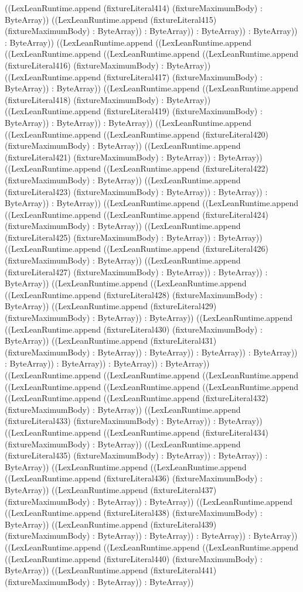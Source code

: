 \documentclass[11pt]{article}
\begin{document}
((LexLeanRuntime.append (fixtureLiteral414) (fixtureMaximumBody) : ByteArray)) ((LexLeanRuntime.append (fixtureLiteral415) (fixtureMaximumBody) : ByteArray)) : ByteArray)) : ByteArray)) : ByteArray)) : ByteArray)) ((LexLeanRuntime.append ((LexLeanRuntime.append ((LexLeanRuntime.append ((LexLeanRuntime.append ((LexLeanRuntime.append (fixtureLiteral416) (fixtureMaximumBody) : ByteArray)) ((LexLeanRuntime.append (fixtureLiteral417) (fixtureMaximumBody) : ByteArray)) : ByteArray)) ((LexLeanRuntime.append ((LexLeanRuntime.append (fixtureLiteral418) (fixtureMaximumBody) : ByteArray)) ((LexLeanRuntime.append (fixtureLiteral419) (fixtureMaximumBody) : ByteArray)) : ByteArray)) : ByteArray)) ((LexLeanRuntime.append ((LexLeanRuntime.append ((LexLeanRuntime.append (fixtureLiteral420) (fixtureMaximumBody) : ByteArray)) ((LexLeanRuntime.append (fixtureLiteral421) (fixtureMaximumBody) : ByteArray)) : ByteArray)) ((LexLeanRuntime.append ((LexLeanRuntime.append (fixtureLiteral422) (fixtureMaximumBody) : ByteArray)) ((LexLeanRuntime.append (fixtureLiteral423) (fixtureMaximumBody) : ByteArray)) : ByteArray)) : ByteArray)) : ByteArray)) ((LexLeanRuntime.append ((LexLeanRuntime.append ((LexLeanRuntime.append ((LexLeanRuntime.append (fixtureLiteral424) (fixtureMaximumBody) : ByteArray)) ((LexLeanRuntime.append (fixtureLiteral425) (fixtureMaximumBody) : ByteArray)) : ByteArray)) ((LexLeanRuntime.append ((LexLeanRuntime.append (fixtureLiteral426) (fixtureMaximumBody) : ByteArray)) ((LexLeanRuntime.append (fixtureLiteral427) (fixtureMaximumBody) : ByteArray)) : ByteArray)) : ByteArray)) ((LexLeanRuntime.append ((LexLeanRuntime.append ((LexLeanRuntime.append (fixtureLiteral428) (fixtureMaximumBody) : ByteArray)) ((LexLeanRuntime.append (fixtureLiteral429) (fixtureMaximumBody) : ByteArray)) : ByteArray)) ((LexLeanRuntime.append ((LexLeanRuntime.append (fixtureLiteral430) (fixtureMaximumBody) : ByteArray)) ((LexLeanRuntime.append (fixtureLiteral431) (fixtureMaximumBody) : ByteArray)) : ByteArray)) : ByteArray)) : ByteArray)) : ByteArray)) : ByteArray)) : ByteArray)) : ByteArray)) ((LexLeanRuntime.append ((LexLeanRuntime.append ((LexLeanRuntime.append ((LexLeanRuntime.append ((LexLeanRuntime.append ((LexLeanRuntime.append ((LexLeanRuntime.append ((LexLeanRuntime.append (fixtureLiteral432) (fixtureMaximumBody) : ByteArray)) ((LexLeanRuntime.append (fixtureLiteral433) (fixtureMaximumBody) : ByteArray)) : ByteArray)) ((LexLeanRuntime.append ((LexLeanRuntime.append (fixtureLiteral434) (fixtureMaximumBody) : ByteArray)) ((LexLeanRuntime.append (fixtureLiteral435) (fixtureMaximumBody) : ByteArray)) : ByteArray)) : ByteArray)) ((LexLeanRuntime.append ((LexLeanRuntime.append ((LexLeanRuntime.append (fixtureLiteral436) (fixtureMaximumBody) : ByteArray)) ((LexLeanRuntime.append (fixtureLiteral437) (fixtureMaximumBody) : ByteArray)) : ByteArray)) ((LexLeanRuntime.append ((LexLeanRuntime.append (fixtureLiteral438) (fixtureMaximumBody) : ByteArray)) ((LexLeanRuntime.append (fixtureLiteral439) (fixtureMaximumBody) : ByteArray)) : ByteArray)) : ByteArray)) : ByteArray)) ((LexLeanRuntime.append ((LexLeanRuntime.append ((LexLeanRuntime.append ((LexLeanRuntime.append (fixtureLiteral440) (fixtureMaximumBody) : ByteArray)) ((LexLeanRuntime.append (fixtureLiteral441) (fixtureMaximumBody) : ByteArray)) : ByteArray)) 
\end{document}
